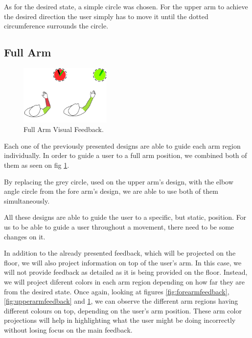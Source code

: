
As for the desired state, a simple circle was chosen. 
For the upper arm to achieve the desired direction the user simply has to move it until the dotted circumference surrounds the circle.

\subsection{Full Arm}

\begin{figure}[!t]
    \begin{center}
        \includegraphics[width=0.4\textwidth]{imgs/approach/fullarmfeedback.png}
    \end{center}
    \caption{Full Arm Visual Feedback.}
    \label{fig:fullarmfeedback}
\end{figure}

Each one of the previously presented designs are able to guide each arm region individually.
In order to guide a user to a full arm position, we combined both of them as seen on fig \ref{fig:fullarmfeedback}.

By replacing the grey circle, used on the upper arm's design, with the elbow angle circle from the fore arm's design, we are able to use both of them simultaneously. 

All these designs are able to guide the user to a specific, but static, position. For us to be able to guide a user throughout a movement, there need to be some changes on it.

In addition to the already presented feedback, which will be projected on the floor, we will also project information on top of the user's arm. 
In this case, we will not provide feedback as detailed as it is being provided on the floor. 
Instead, we will project diferent colors in each arm region depending on how far they are from the desired state. 
Once again, looking at figures \ref{fig:forearmfeedback}, \ref{fig:upperarmfeedback} and \ref{fig:fullarmfeedback}, we can observe the 
different arm regions having different colours on top, depending on the user's arm position.
These arm color projections will help in highlighting what the user might be doing incorrectly without losing focus on the main feedback.

